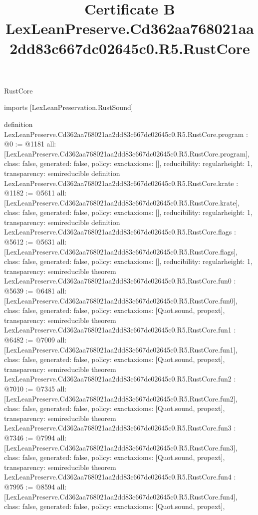 \begin{lexlean}{RustCore}
\title{Certificate B LexLeanPreserve.Cd362aa768021aa2dd83c667dc02645c0.R5.RustCore}
\begin{coremodule}
imports [LexLeanPreservation.RustSound]

definition LexLeanPreserve.Cd362aa768021aa2dd83c667dc02645c0.R5.RustCore.program : @0 := @1181 {
  all: [LexLeanPreserve.Cd362aa768021aa2dd83c667dc02645c0.R5.RustCore.program],
  class: false,
  generated: false,
  policy: exact{axioms: []},
  reducibility: regular{height: 1},
  transparency: semireducible
}
definition LexLeanPreserve.Cd362aa768021aa2dd83c667dc02645c0.R5.RustCore.krate : @1182 := @5611 {
  all: [LexLeanPreserve.Cd362aa768021aa2dd83c667dc02645c0.R5.RustCore.krate],
  class: false,
  generated: false,
  policy: exact{axioms: []},
  reducibility: regular{height: 1},
  transparency: semireducible
}
definition LexLeanPreserve.Cd362aa768021aa2dd83c667dc02645c0.R5.RustCore.flags : @5612 := @5631 {
  all: [LexLeanPreserve.Cd362aa768021aa2dd83c667dc02645c0.R5.RustCore.flags],
  class: false,
  generated: false,
  policy: exact{axioms: []},
  reducibility: regular{height: 1},
  transparency: semireducible
}
theorem LexLeanPreserve.Cd362aa768021aa2dd83c667dc02645c0.R5.RustCore.fun0 : @5639 := @6481 {
  all: [LexLeanPreserve.Cd362aa768021aa2dd83c667dc02645c0.R5.RustCore.fun0],
  class: false,
  generated: false,
  policy: exact{axioms: [Quot.sound, propext]},
  transparency: semireducible
}
theorem LexLeanPreserve.Cd362aa768021aa2dd83c667dc02645c0.R5.RustCore.fun1 : @6482 := @7009 {
  all: [LexLeanPreserve.Cd362aa768021aa2dd83c667dc02645c0.R5.RustCore.fun1],
  class: false,
  generated: false,
  policy: exact{axioms: [Quot.sound, propext]},
  transparency: semireducible
}
theorem LexLeanPreserve.Cd362aa768021aa2dd83c667dc02645c0.R5.RustCore.fun2 : @7010 := @7345 {
  all: [LexLeanPreserve.Cd362aa768021aa2dd83c667dc02645c0.R5.RustCore.fun2],
  class: false,
  generated: false,
  policy: exact{axioms: [Quot.sound, propext]},
  transparency: semireducible
}
theorem LexLeanPreserve.Cd362aa768021aa2dd83c667dc02645c0.R5.RustCore.fun3 : @7346 := @7994 {
  all: [LexLeanPreserve.Cd362aa768021aa2dd83c667dc02645c0.R5.RustCore.fun3],
  class: false,
  generated: false,
  policy: exact{axioms: [Quot.sound, propext]},
  transparency: semireducible
}
theorem LexLeanPreserve.Cd362aa768021aa2dd83c667dc02645c0.R5.RustCore.fun4 : @7995 := @8594 {
  all: [LexLeanPreserve.Cd362aa768021aa2dd83c667dc02645c0.R5.RustCore.fun4],
  class: false,
  generated: false,
  policy: exact{axioms: [Quot.sound, propext]},
}
\end{coremodule}
\end{lexlean}
